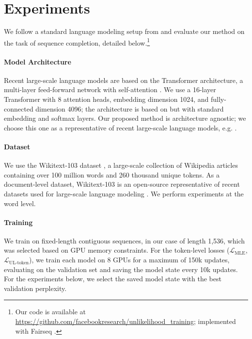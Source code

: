 \section{Experiments}
\label{sec:exp}

\label{ssec:expr-setup} 

We follow a standard language modeling setup from \citet{baevski2018adaptive}  and evaluate our method on the task of sequence completion, detailed below.\footnote{Our code is available at \url{https://github.com/facebookresearch/unlikelihood_training}; implemented with Fairseq \citep{ott2019fairseq}.}

\paragraph{Model Architecture} Recent large-scale language models are based on the Transformer architecture, a multi-layer feed-forward network with self-attention \citep{vaswani2017attention}. We use a 16-layer Transformer with 8 attention heads, embedding dimension 1024, and fully-connected dimension 4096; the architecture is based on \citet{baevski2018adaptive} but with standard embedding and softmax layers. Our proposed method is architecture agnostic; we choose this one as a representative of recent large-scale language models, e.g. \citet{radford2019language}.

\paragraph{Dataset} 

We use the Wikitext-103 dataset \citep{merity2016pointer}, a large-scale collection of Wikipedia articles containing over 100 million words and 260 thousand unique tokens. As a document-level dataset, Wikitext-103 is an open-source representative of recent datasets used for large-scale language modeling \citep{baevski2018adaptive,radford2019language}. We perform experiments at the word level. 

\paragraph{Training} 
We train on fixed-length contiguous sequences, in our case of length 1,536, which was selected based on GPU memory constraints. For the token-level losses ($\mathcal{L}_{\text{MLE}}$, $\mathcal{L}_{\text{UL-token}}$), we train each model on 8 GPUs for a maximum of 150k updates, evaluating on the validation set and saving the model state every 10k updates. For the experiments below, we select the saved model state with the best validation perplexity. 

